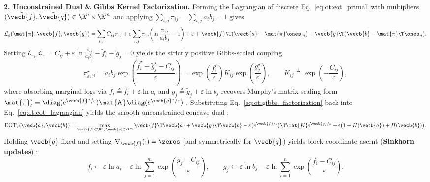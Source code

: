 \documentclass[../../../../master.tex]{subfiles}
\begin{document}
\begin{coremath}
\textbf{2. Unconstrained Dual \& Gibbs Kernel Factorization.} Forming the Lagrangian of discrete Eq.~\eqref{eq:ot:eot_primal} with multipliers $(\tilde{\vecb{f}}, \tilde{\vecb{g}}) \in \R^n \times \R^m$ and applying $\sum_{i,j}\pi_{ij} = \sum_{i,j} a_i b_j = 1$ gives
\begin{equation}
\label{eq:ot:eot_lagrangian}
  \mathcal{L}_\varepsilon(\mat{\pi}, \tilde{\vecb{f}}, \tilde{\vecb{g}})
  = \sum_{i,j} C_{ij}\pi_{ij} + \varepsilon \sum_{i,j}\pi_{ij}\!\left(\ln\frac{\pi_{ij}}{a_i b_j} - 1\right) + \varepsilon
  + \tilde{\vecb{f}}\T(\vecb{a} - \mat{\pi}\ones_m) + \tilde{\vecb{g}}\T(\vecb{b} - \mat{\pi}\T\ones_n).
\end{equation}
Setting $\partial_{\pi_{ij}}\mathcal{L}_\varepsilon = C_{ij} + \varepsilon\ln\frac{\pi_{ij}}{a_i b_j} - \tilde{f}_i - \tilde{g}_j = 0$ yields the strictly positive Gibbs-scaled coupling
\begin{equation}
\label{eq:ot:gibbs_factorization}
  \pi_{\varepsilon, ij}^\star = a_i b_j \exp\!\left(\frac{\tilde{f}_i^\star + \tilde{g}_j^\star - C_{ij}}{\varepsilon}\right)
  = \exp\!\left(\frac{f_i^\star}{\varepsilon}\right) K_{ij} \exp\!\left(\frac{g_j^\star}{\varepsilon}\right), \qquad
  K_{ij} \triangleq \exp\!\left(-\frac{C_{ij}}{\varepsilon}\right),
\end{equation}
where absorbing marginal logs via $f_i \triangleq \tilde{f}_i + \varepsilon\ln a_i$ and $g_j \triangleq \tilde{g}_j + \varepsilon\ln b_j$ recovers Murphy's matrix-scaling form $\mat{\pi}_\varepsilon^\star = \diag(e^{\vecb{f}^\star/\varepsilon})\mat{K}\diag(e^{\vecb{g}^\star/\varepsilon})$ . Substituting Eq.~\eqref{eq:ot:gibbs_factorization} back into Eq.~\eqref{eq:ot:eot_lagrangian} yields the smooth unconstrained concave dual  :
\begin{equation}
\label{eq:ot:eot_dual}
  \mathrm{EOT}_\varepsilon(\vecb{a}, \vecb{b})
  = \max_{\vecb{f} \in \R^n,\, \vecb{g} \in \R^m}
  \vecb{f}\T\vecb{a} + \vecb{g}\T\vecb{b} - \varepsilon \bigl(e^{\vecb{f}/\varepsilon}\bigr)\T \mat{K} e^{\vecb{g}/\varepsilon} + \varepsilon\bigl(1 + H(\vecb{a}) + H(\vecb{b})\bigr).
\end{equation}
Holding $\vecb{g}$ fixed and setting $\nabla_{\vecb{f}}(\cdot) = \zeros$ (and symmetrically for $\vecb{g}$) yields block-coordinate ascent (\textbf{Sinkhorn updates})  :
\begin{equation}
\label{eq:ot:sinkhorn_updates}
  f_i \leftarrow \varepsilon\ln a_i - \varepsilon\ln\sum_{j=1}^m \exp\!\left(\frac{g_j - C_{ij}}{\varepsilon}\right), \qquad
  g_j \leftarrow \varepsilon\ln b_j - \varepsilon\ln\sum_{i=1}^n \exp\!\left(\frac{f_i - C_{ij}}{\varepsilon}\right).
\end{equation}


\end{coremath}
\end{document}
